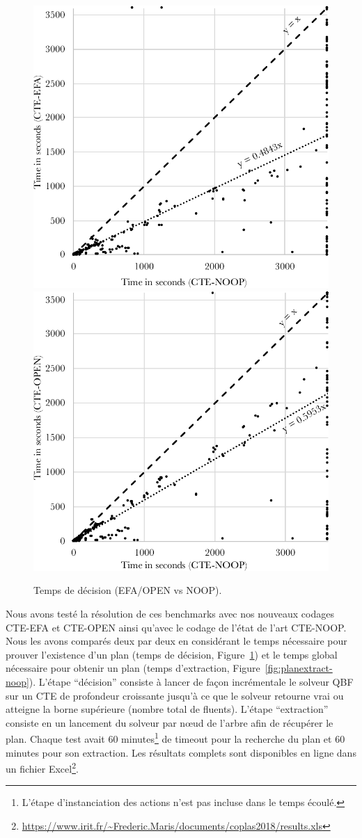 \begin{figure}[ht!] \centering
\begin{center} \includegraphics[width=.48\textwidth]{figures/time-plansat-efa-noop3} %
\hfill
\includegraphics[width=.48\textwidth]{figures/time-plansat-open-noop3} \end{center}
\caption{Temps de décision (EFA/OPEN vs NOOP).}
\label{fig:plansat-noop}
\end{figure}

Nous avons testé la résolution de ces benchmarks avec nos nouveaux codages CTE-EFA et CTE-OPEN ainsi qu'avec le codage de l'état de l'art CTE-NOOP. Nous les avons comparés deux par deux en considérant le temps nécessaire pour prouver l'existence d'un plan (temps de décision, Figure~\ref{fig:plansat-noop}) et le temps global nécessaire pour obtenir un plan (temps d'extraction, Figure~\ref{fig:planextract-noop}). L'étape ``décision'' consiste à lancer de façon incrémentale le solveur QBF sur un CTE de profondeur croissante jusqu'à ce que le solveur retourne vrai ou atteigne la borne supérieure (nombre total de fluents). L'étape ``extraction'' consiste en un lancement du solveur par n\oe ud de l'arbre afin de récupérer le plan. Chaque test avait 60 minutes\footnote{L'étape d'instanciation des actions n'est pas incluse dans le temps écoulé.} de timeout pour la recherche du plan et 60 minutes pour son extraction.
Les résultats complets sont disponibles en ligne dans un fichier Excel\footnote{\url{https://www.irit.fr/~Frederic.Maris/documents/coplas2018/results.xls}}.

